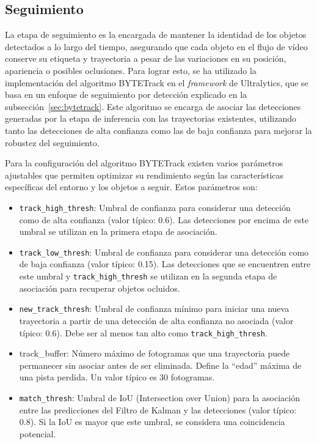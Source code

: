 \documentclass[11pt,spanish,listoffigures,listoftables]{tfgetsinf}
\begin{document}
\subsection{Seguimiento} \label{sec:seguimiento}
La etapa de seguimiento es la encargada de mantener la identidad de los objetos detectados a lo largo del tiempo, asegurando que cada objeto en el flujo de vídeo conserve su etiqueta y trayectoria a pesar de las variaciones en su posición, apariencia o posibles oclusiones. Para lograr esto, se ha utilizado la implementación del algoritmo BYTETrack en el \textit{framework} de Ultralytics\cite{Jocher_Ultralytics_YOLO_2023}, que se basa en un enfoque de seguimiento por detección explicado en la subsección~\ref{sec:bytetrack}. Este algoritmo se encarga de asociar las detecciones generadas por la etapa de inferencia con las trayectorias existentes, utilizando tanto las detecciones de alta confianza como las de baja confianza para mejorar la robustez del seguimiento.

Para la configuración del algoritmo BYTETrack existen varios parámetros ajustables que permiten optimizar su rendimiento según las características específicas del entorno y los objetos a seguir. Estos parámetros son:
\begin{itemize}
   \item \texttt{track\_high\_thresh}: Umbral de confianza para considerar una detección como de alta confianza (valor típico: 0.6). Las detecciones por encima de este umbral se utilizan en la primera etapa de asociación.
   \item \texttt{track\_low\_thresh}: Umbral de confianza para considerar una detección como de baja confianza (valor típico: 0.15). Las detecciones que se encuentren entre este umbral y \texttt{track\_high\_thresh} se utilizan en la segunda etapa de asociación para recuperar objetos ocluidos.
   \item \texttt{new\_track\_thresh}: Umbral de confianza mínimo para iniciar una nueva trayectoria a partir de una detección de alta confianza no asociada (valor típico: 0.6). Debe ser al menos tan alto como \texttt{track\_high\_thresh}.
   \item track\_buffer: Número máximo de fotogramas que una trayectoria puede permanecer sin asociar antes de ser eliminada. Define la ``edad'' máxima de una pista perdida. Un valor típico es 30 fotogramas.
   \item \texttt{match\_thresh}: Umbral de IoU (Intersection over Union) para la asociación entre las predicciones del Filtro de Kalman y las detecciones (valor típico: 0.8). Si la IoU es mayor que este umbral, se considera una coincidencia potencial.
\end{itemize}
\end{document}
